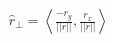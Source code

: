 \documentclass[preview]{standalone}
\begin{document}
\begin{align*}
\hat{r}_\bot =\left\langle \frac{-r_y}{||r||},\frac{r_x}{||r||} \right\rangle
\end{align*}
\end{document}
